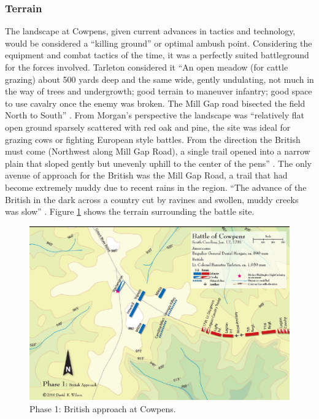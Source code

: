 \subsubsection{Terrain}

The landscape at Cowpens, given current advances in tactics and technology,
would be considered a ``killing ground'' or optimal ambush point.  Considering the
equipment and combat tactics of the time, it was a perfectly suited battleground
for the forces involved.  Tarleton considered it ``An open meadow (for cattle
grazing) about 500 yards deep and the same wide, gently undulating, not much in
the way of trees and undergrowth; good terrain to maneuver infantry; good space
to use cavalry once the enemy was broken.  The Mill Gap road bisected the field
North to South'' \cite[326]{stephenson_patriot_2007}.
From Morgan's perspective the landscape was ``relatively flat open ground
sparsely scattered with red oak and pine, the site was ideal for grazing cows or
fighting European style battles.  From the direction the British must come
(Northwest along Mill Gap Road), a single trail opened into a narrow plain that
sloped gently but unevenly uphill to the center of the pens'' \cite[45]{moncure_cowpens_1996}.
The only avenue of approach for the British was the Mill Gap Road, a trail that
had become extremely muddy due to recent rains in the region. ``The advance of
the British in the dark across a country cut by ravines and swollen, muddy
creeks was slow'' \cite[126]{lumpkin_savannah_1981}.  Figure \ref{terrain1a}
shows the terrain surrounding the battle site.  

\begin{figure}[h]
    \begin{center}
    \includegraphics[width=\textwidth]{gfx/futch1}
    \end{center}
    \caption{Phase 1: British approach at Cowpens. \cite{wilson_blogmap}}
    \label{terrain1a}
\end{figure}


